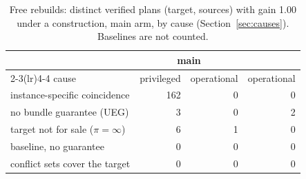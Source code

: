 
\begin{table}[t]
  \centering
  \small
  \caption{Free rebuilds: distinct verified plans (target, sources) with gain 1.00 under a construction, main arm, by cause (Section~\ref{sec:causes}). Baselines are not counted.}
  \label{tab:causes}
  \begin{tabular}{@{}lrrr@{}}
    \toprule
    & \multicolumn{2}{c}{\sqlshare{} main} & \tpch{} \\
    \cmidrule(lr){2-3}\cmidrule(lr){4-4}
    cause & privileged & operational & operational \\
    \midrule
    instance-specific coincidence & 162 & 0 & 0 \\
    no bundle guarantee (UEG) & 3 & 0 & 2 \\
    target not for sale ($\pi = \infty$) & 6 & 1 & 0 \\
    baseline, no guarantee & 0 & 0 & 0 \\
    conflict sets cover the target & 0 & 0 & 0 \\
    \bottomrule
  \end{tabular}
\end{table}
